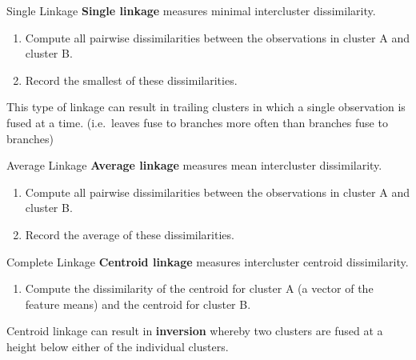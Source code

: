 \documentclass[
  ignorenonframetext,
  aspectratio=169,
]{beamer}
\providecommand{\tightlist}{%
  \setlength{\itemsep}{0pt}\setlength{\parskip}{0pt}}\usepackage{longtable,booktabs,array}
\begin{document}
\begin{frame}{Single Linkage}
\protect\hypertarget{single-linkage}{}
\textbf{Single linkage} measures minimal intercluster dissimilarity.

\begin{enumerate}
\item
  Compute all pairwise dissimilarities between the observations in
  cluster A and cluster B.
\item
  Record the smallest of these dissimilarities.
\end{enumerate}

This type of linkage can result in trailing clusters in which a single
observation is fused at a time. (i.e.~leaves fuse to branches more often
than branches fuse to branches)
\end{frame}

\begin{frame}{Average Linkage}
\protect\hypertarget{average-linkage}{}
\textbf{Average linkage} measures mean intercluster dissimilarity.

\begin{block}{\quad}
\protect\hypertarget{section-1}{}
\begin{enumerate}
\item
  Compute all pairwise dissimilarities between the observations in
  cluster A and cluster B.
\item
  Record the average of these dissimilarities.
\end{enumerate}
\end{block}
\end{frame}

\begin{frame}{Complete Linkage}
\protect\hypertarget{complete-linkage-1}{}
\textbf{Centroid linkage} measures intercluster centroid dissimilarity.

\begin{block}{\quad}
\protect\hypertarget{section-2}{}
\begin{enumerate}
\tightlist
\item
  Compute the dissimilarity of the centroid for cluster A (a vector of
  the feature means) and the centroid for cluster B.
\end{enumerate}

Centroid linkage can result in \textbf{inversion} whereby two clusters
are fused at a height below either of the individual clusters.
\end{block}
\end{frame}
\end{document}
